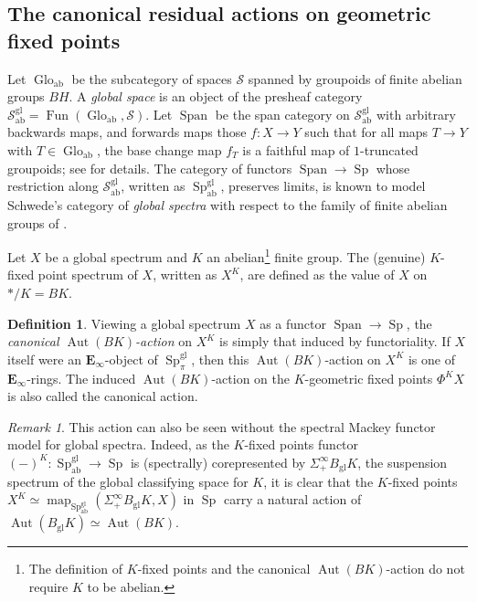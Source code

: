 \documentclass[11pt, a4paper]{article}
\newcommand{\ab}{\mathrm{ab}}
\newcommand{\gl}{\mathrm{gl}}
\newcommand{\1}{\mathbf{1}}
\DeclareMathOperator{\Fun}{Fun}
\DeclareMathOperator{\map}{map}
\DeclareMathOperator{\Glo}{Glo}
\DeclareMathOperator{\Span}{Span}
\DeclareMathOperator{\Sp}{Sp}
\newcommand{\Spc}{\mathcal{S}}
\DeclareMathOperator{\Aut}{Aut}
\newcommand{\E}{\mathbf{E}}
\theoremstyle{plain}
\theoremstyle{definition}
\newtheorem{mydef}[equation]{Definition}
\theoremstyle{remark}\numberwithin{equation}{section}
\newtheorem{remark}[equation]{Remark}
\begin{document}
\subsection{The canonical residual actions on geometric fixed points}\label{ssec:from_tempered_to_global_spectra}
Let $\Glo_\ab$ be the subcategory of spaces $\Spc$ spanned by groupoids of finite abelian groups $BH$. A \emph{global space} is an object of the presheaf category $\Spc_\ab^\gl = \Fun(\Glo_\ab, \Spc)$. Let $\Span$ be the span category on $\Spc_\ab^\gl$ with arbitrary backwards maps, and forwards maps those $f\colon X \to Y$ such that for all maps $T \to Y$ with $T\in \Glo_\ab$, the base change map $f_T$ is a faithful map of $1$-truncated groupoids; see \cite[ \& Ex.2.1.12]{temperedglobal} for details. The category of functors $\Span \to \Sp$ whose restriction along $\Spc_\ab^\gl$, written as $\Sp^\gl_\ab$, preserves limits, is known to model Schwede's category of \emph{global spectra} with respect to the family of finite abelian groups of \cite{s}.

Let $X$ be a global spectrum and $K$ an abelian\footnote{The definition of $K$-fixed points and the canonical $\Aut(BK)$-action do not require $K$ to be abelian.} finite group. The (genuine) $K$-fixed point spectrum of $X$, written as $X^K$, are defined as the value of $X$ on $\ast / K = BK$.

\begin{mydef}\label{df:canonicalautBKaction}
Viewing a global spectrum $X$ as a functor $\Span \to \Sp$, the \emph{canonical $\Aut(BK)$-action} on $X^K$ is simply that induced by functoriality. If $X$ itself were an $\E_\infty$-object of $\Sp_\pi^\gl$, then this $\Aut(BK)$-action on $X^K$ is one of $\E_\infty$-rings. The induced $\Aut(BK)$-action on the $K$-geometric fixed points $\Phi^K X$ is also called the canonical action.
\end{mydef}

\begin{remark}
    This action can also be seen without the spectral Mackey functor model for global spectra. Indeed, as the $K$-fixed points functor $(-)^K \colon \Sp^\gl_\ab \to \Sp$ is (spectrally) corepresented by $\Sigma_+^\infty B_\gl K$, the suspension spectrum of the global classifying space for $K$, it is clear that the $K$-fixed points $X^{K} \simeq \map_{\Sp^\gl_\ab}(\Sigma_+^\infty B_\gl K, X)$ in $\Sp$ carry a natural action of $\Aut(B_\gl K) \simeq \Aut(BK)$.
\end{remark}
\end{document}
